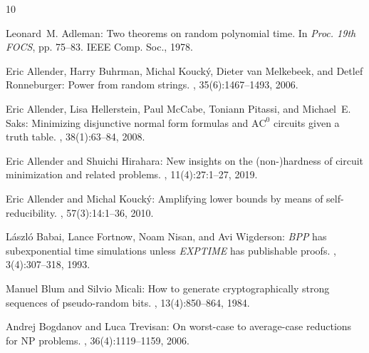 \documentclass[11pt]{article}
\numberwithin{equation}{section}
\theoremstyle{definition}
\theoremstyle{plain}
\begin{document}
\tocrefpdfbookmark
\begin{thebibliography}{10}

{\sc Leonard~M. Adleman}: Two theorems on random polynomial time.
\newblock In {\em Proc. 19th FOCS}, pp. 75--83. IEEE Comp. Soc., 1978.

{\sc Eric Allender, Harry Buhrman, Michal Kouck{\'{y}}, Dieter van Melkebeek,
  and Detlef Ronneburger}: Power from random strings.
, 35(6):1467--1493, 2006.
\newblock [\epfmtdoi{10.1137/050628994}]

{\sc Eric Allender, Lisa Hellerstein, Paul McCabe, Toniann Pitassi, and
  Michael~E. Saks}: Minimizing disjunctive normal form formulas and
  $\mathrm{AC}^0$ circuits given a truth table.
, 38(1):63--84, 2008.
\newblock [\epfmtdoi{10.1137/060664537}]

{\sc Eric Allender and Shuichi Hirahara}: New insights on the (non-)hardness of
  circuit minimization and related problems.
, 11(4):27:1--27, 2019.
\newblock [\epfmtdoi{10.1145/3349616}]

{\sc Eric Allender and Michal Kouck{\'{y}}}: Amplifying lower bounds by means
  of self-reducibility.
, 57(3):14:1--36, 2010.
\newblock [\epfmtdoi{10.1145/1706591.1706594}]

{\sc L{\'{a}}szl{\'{o}} Babai, Lance Fortnow, Noam Nisan, and Avi Wigderson}:
  \emph{BPP} has subexponential time simulations unless \emph{EXPTIME} has
  publishable proofs.
, 3(4):307--318, 1993.
\newblock [\epfmtdoi{10.1007/BF01275486}]

{\sc Manuel Blum and Silvio Micali}: How to generate cryptographically strong
  sequences of pseudo-random bits.
, 13(4):850--864, 1984.
\newblock [\epfmtdoi{10.1137/0213053}]

{\sc Andrej Bogdanov and Luca Trevisan}: On worst-case to average-case
  reductions for {NP} problems.
, 36(4):1119--1159, 2006.
\newblock [\epfmtdoi{10.1137/S0097539705446974}]


\end{thebibliography}
\end{document}
